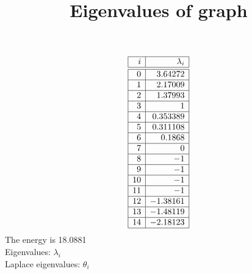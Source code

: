 \documentclass[12pt]{article}
\newcommand\setTBstruts{\def\T{\rule{0pt}{2.6ex}}%
\def\B{\rule[-1.2ex]{0pt}{0pt}}}
\begin{document}
 
\setTBstruts



{\allowdisplaybreaks%






\title{Eigenvalues of graph}
\author{}%
\maketitle%
%



$$
\begin{array}{|r|r|}
\hline
 i  & \lambda_i  \\
\hline
\hline
0 & 3.64272\\
\hline
1 & 2.17009\\
\hline
2 & 1.37993\\
\hline
3 & 1\\
\hline
4 & 0.353389\\
\hline
5 & 0.311108\\
\hline
6 & 0.1868\\
\hline
7 & 0\\
\hline
8 & -1\\
\hline
9 & -1\\
\hline
10 & -1\\
\hline
11 & -1\\
\hline
12 & -1.38161\\
\hline
13 & -1.48119\\
\hline
14 & -2.18123\\
\hline
\end{array}
$$
The energy is 18.0881\\
Eigenvalues: $\lambda_i$\\
Laplace eigenvalues: $\theta_i$\\


%


%


}%
\end{document}
